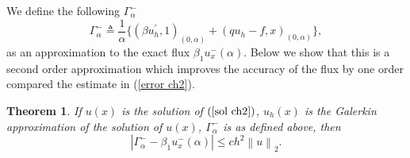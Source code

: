 \documentclass[11pt]{article}
\numberwithin{equation}{section}
\newtheorem{theorem}{Theorem}[section]
\begin{document}
We define the following  $\Gamma_{\alpha}^{-}$
\begin{equation}\label{f ch2}
  \Gamma_{\alpha}^{-}\triangleq\frac{1}{\alpha}\{(\beta u_{h}^{'}, 1)_{(0,\alpha)}
  +(qu_{h}-f, x)_{(0,\alpha)}\},
\end{equation}
as an approximation to the exact flux $\beta_{1}u_{x}^{-}\left(\alpha\right)$.
Below we show that this is a second order approximation which improves the accuracy of the flux by one order
 compared the estimate in (\ref{error ch2}).
\begin{theorem}{}
If $u\left(x\right)$ is the solution of $\left(\ref{sol ch2}\right)$,
$u_{h}\left(x\right)$ is the Galerkin approximation of the solution of $u\left(x\right)$,
$\Gamma_{\alpha}^{-}$ is as defined above, then
\begin{equation}\label{a ch2}
\left|\Gamma_{\alpha}^{-}-\beta_{1}u_{x}^{-}\left(\alpha\right)\right|\leq ch^{2}\left\|u\right\|_{2}.
\end{equation}
\end{theorem}
\end{document}

